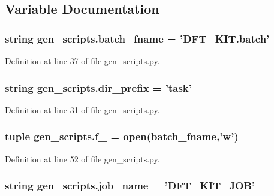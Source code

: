 \subsection{Variable Documentation}
\hypertarget{namespacegen__scripts_aaaae961ae3447d960ad9f06336b3f97d}{
\subsubsection[{batch\+\_\+fname}]{\setlength{\rightskip}{0pt plus 5cm}string gen\+\_\+scripts.\+batch\+\_\+fname = 'D\+F\+T\+\_\+\+K\+I\+T.\+batch'}}\label{namespacegen__scripts_aaaae961ae3447d960ad9f06336b3f97d}


Definition at line 37 of file gen\+\_\+scripts.\+py.

\hypertarget{namespacegen__scripts_a15f71844ccbc98f6a1f91347455f7d87}{
\subsubsection[{dir\+\_\+prefix}]{\setlength{\rightskip}{0pt plus 5cm}string gen\+\_\+scripts.\+dir\+\_\+prefix = 'task'}}\label{namespacegen__scripts_a15f71844ccbc98f6a1f91347455f7d87}


Definition at line 31 of file gen\+\_\+scripts.\+py.

\hypertarget{namespacegen__scripts_a895fcc1e9240e322fa357b01cf1a0c8c}{
\subsubsection[{f\+\_\+}]{\setlength{\rightskip}{0pt plus 5cm}tuple gen\+\_\+scripts.\+f\+\_\+ = open({\bf batch\+\_\+fname},'w')}}\label{namespacegen__scripts_a895fcc1e9240e322fa357b01cf1a0c8c}


Definition at line 52 of file gen\+\_\+scripts.\+py.

\hypertarget{namespacegen__scripts_a906734da531d3026197844cbba1dab23}{
\subsubsection[{job\+\_\+name}]{\setlength{\rightskip}{0pt plus 5cm}string gen\+\_\+scripts.\+job\+\_\+name = 'D\+F\+T\+\_\+\+K\+I\+T\+\_\+\+J\+O\+B'}}\label{namespacegen__scripts_a906734da531d3026197844cbba1dab23}


